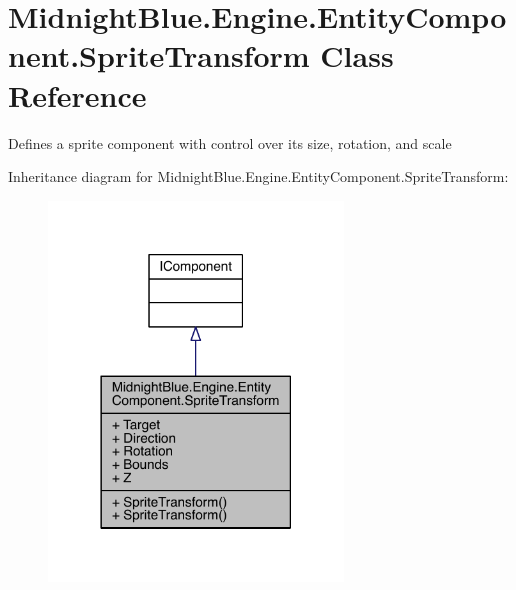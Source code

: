\hypertarget{class_midnight_blue_1_1_engine_1_1_entity_component_1_1_sprite_transform}{}\section{Midnight\+Blue.\+Engine.\+Entity\+Component.\+Sprite\+Transform Class Reference}
\label{class_midnight_blue_1_1_engine_1_1_entity_component_1_1_sprite_transform}


Defines a sprite component with control over its size, rotation, and scale  




Inheritance diagram for Midnight\+Blue.\+Engine.\+Entity\+Component.\+Sprite\+Transform\+:
\nopagebreak
\begin{figure}[H]
\begin{center}
\leavevmode
\includegraphics[width=222pt]{class_midnight_blue_1_1_engine_1_1_entity_component_1_1_sprite_transform__inherit__graph}
\end{center}
\end{figure}


